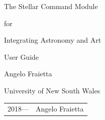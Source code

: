\documentclass[10pt,a4paper,extrafontsizes]{memoir}
\newcommand{\PWnote}[2]{}
\begin{document}





\firmlists
\midsloppy
\raggedbottom
{}




\frontmatter
\pagestyle{empty}


\vspace*{\fill}
\begin{center}
\HUGE\textsf{The Stellar Command Module}\par
\end{center}
\begin{center}
\LARGE\textsf{for}\par
\end{center}
\begin{center}
\HUGE\textsf{Integrating Astronomy and Art}\par
\end{center}

\begin{center}
\Huge\textsf{User Guide}\par
\end{center}
\begin{center}
\LARGE\textsf{Angelo Fraietta}\par
\bigskip
\LARGE\textsf{University of New South Wales}\par
\medskip

\end{center}
\vspace*{\fill}
\def\THP{T\kern-0.2em H\kern-0.4em P}%
\def\THP{T\kern-0.15em H\kern-0.3em P}%
\newcommand*{\THPress}{The Herries Press}%
\begin{center}

\setlength{\droptitle}{0pt}%
\end{center}
\clearpage

\PWnote{2009/06/26}{Updated the copyright page for 9th impression}
\begingroup
\footnotesize
\setlength{\parindent}{0pt}
\setlength{\parskip}{\baselineskip}


\begin{tabular}{@{} l l}
  \textcopyright{} 2018\:---\:2019 &Angelo Fraietta \\
\end{tabular}
\end{document}
